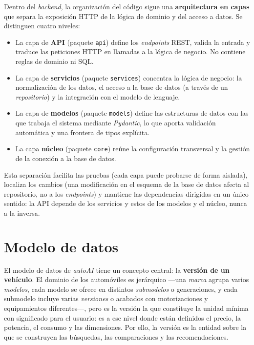 Dentro del \emph{backend}, la organización del código sigue una
\textbf{arquitectura en capas} que separa la exposición HTTP de la lógica de
dominio y del acceso a datos. Se distinguen cuatro niveles:

\begin{itemize}
    \item La capa de \textbf{API} (paquete \texttt{api}) define los
    \emph{endpoints} REST, valida la entrada y traduce las peticiones HTTP en
    llamadas a la lógica de negocio. No contiene reglas de dominio ni SQL.

    \item La capa de \textbf{servicios} (paquete \texttt{services}) concentra la
    lógica de negocio: la normalización de los datos, el acceso a la base de
    datos (a través de un \emph{repositorio}) y la integración con el modelo de
    lenguaje.

    \item La capa de \textbf{modelos} (paquete \texttt{models}) define las
    estructuras de datos con las que trabaja el sistema mediante \emph{Pydantic},
    lo que aporta validación automática y una frontera de tipos explícita.

    \item La capa \textbf{núcleo} (paquete \texttt{core}) reúne la configuración
    transversal y la gestión de la conexión a la base de datos.
\end{itemize}

Esta separación facilita las pruebas (cada capa puede probarse de forma
aislada), localiza los cambios (una modificación en el esquema de la base de
datos afecta al repositorio, no a los \emph{endpoints}) y mantiene las
dependencias dirigidas en un único sentido: la API depende de los servicios y
estos de los modelos y el núcleo, nunca a la inversa.

\section{Modelo de datos}
\label{sec:modelo-datos}

El modelo de datos de \emph{autoAI} tiene un concepto central: la
\textbf{versión de un vehículo}. El dominio de los automóviles es jerárquico
—una \emph{marca} agrupa varios \emph{modelos}, cada modelo se ofrece en
distintos \emph{submodelos} o generaciones, y cada submodelo incluye varias
\emph{versiones} o acabados con motorizaciones y equipamientos diferentes—, pero
es la versión la que constituye la unidad mínima con significado para el usuario:
es a ese nivel donde están definidos el precio, la potencia, el consumo y las
dimensiones. Por ello, la versión es la entidad sobre la que se construyen las
búsquedas, las comparaciones y las recomendaciones.

